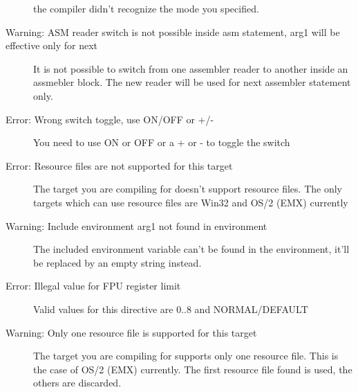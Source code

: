 \begin{description}
 the compiler didn't recognize the mode you specified.
\item [Warning: ASM reader switch is not possible inside asm statement, arg1 will be effective only for next]
 It is not possible to switch from one assembler reader to another
 inside an assmebler block. The new reader will be used for next
 assembler statement only.
\item [Error: Wrong switch toggle, use ON/OFF or +/-]
 You need to use ON or OFF or a + or - to toggle the switch
\item [Error: Resource files are not supported for this target]
 The target you are compiling for doesn't support resource files. The
 only targets which can use resource files are Win32 and OS/2 (EMX) currently
\item [Warning: Include environment arg1 not found in environment]
 The included environment variable can't be found in the environment, it'll
 be replaced by an empty string instead.
\item [Error: Illegal value for FPU register limit]
 Valid values for this directive are 0..8 and NORMAL/DEFAULT
\item [Warning: Only one resource file is supported for this target]
 The target you are compiling for supports only one resource file. This is the
 case of OS/2 (EMX) currently. The first resource file found is used, the
 others are discarded.
 \end{description}
